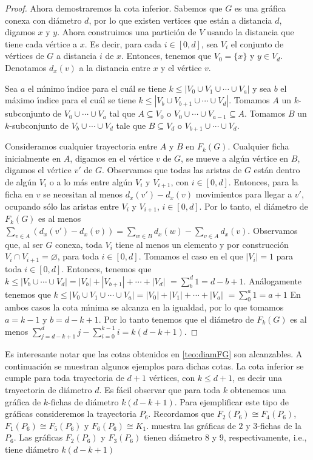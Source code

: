 \begin{proof}
Ahora demostraremos la cota inferior. Sabemos que $G$ es una gr\'afica conexa
con di\'ametro $d$, por lo que existen vertices que est\'an a distancia
$d$, digamos $x$ y $y$. Ahora construimos una partici\'on de $V$ usando  la
distancia que tiene cada v\'ertice a $x$. Es decir, para cada $i\in [0,d]$,
sea $V_{i}$ el conjunto de v\'ertices de $G$ a distancia $i$ de $x$. Entonces,
tenemos que $V_{0}=\{x\}$ y $y\in V_{d}$. Denotamos $d_x(v)$ a la distancia
entre $x$ y el v\'ertice $v$.

Sea $a$ el m\'\i{}nimo \'\i{}ndice para el cu\'al se tiene $k \leq |V_{0}\cup
V_{1}\cup \cdots \cup V_{a}|$ y sea $b$ el m\'aximo \'\i{}ndice para el cu\'al se
tiene $k\leq |V_{b}\cup V_{b+1}\cup \cdots \cup V_{d}|$. Tomamos $A$ un
$k$-subconjunto de $V_{0}\cup \cdots \cup V_{a}$  tal que $A\subseteq
V_{0}$ o $V_{0}\cup \cdots \cup V_{a-1}\subseteq A$. Tomamos $B$ un
$k$-subconjunto de $V_{b}\cup \cdots \cup V_{d}$ tale que
$B\subseteq V_{d}$ o $V_{b+1}\cup \cdots \cup V_{d}$. 

Consideramos cualquier trayectoria entre $A$ y $B$ en $F_{k}(G)$. Cualquier
ficha inicialmente en $A$, digamos en el v\'ertice $v$ de $G$, se mueve a
alg\'un v\'ertice en $B$, digamos el v\'ertice $v'$ de $G$. Observamos que todas
las aristas de $G$ est\'an dentro de alg\'un $V_{i}$ o a lo m\'as entre alg\'un
$V_{i}$ y $V_{i+1}$, con $i\in[0,d]$. Entonces, para la ficha en $v$ se
necesitan al menos $d_x(v')-d_x(v)$ movimientos para llegar a $v'$, ocupando
s\'olo las aristas entre $V_{i}$ y $V_{i+1}$, $i\in [0,d]$. Por lo tanto,
el di\'ametro de $F_{k}(G)$ es al menos $\sum_{v\in A}(d_x(v')-d_x(v))=
\sum_{w\in B}d_x(w)-\sum_{v\in A}d_x(v)$. Observamos que, al ser $G$ conexa,
toda $V_{i}$ tiene al menos un elemento y por construcci\'on $V_{i} \cap
V_{i+1}=\varnothing$, para toda $i\in [0,d]$. Tomamos el caso en el que
$|V_{i}|=1$ para toda $i\in [0,d]$. Entonces, tenemos que $k\leq
|V_{b}\cup\cdots\cup V_{d}|=|V_{b}|+|V_{b+1}|+\cdots +|V_d|$
$=\sum_{b}^{d}1 = d -b+1$. An\'alogamente tenemos que $k\leq
|V_{0}\cup V_{1}\cup \cdots \cup V_{a}|=|V_{0}|+|V_{1}|+\cdots + |V_{a}|$
$=\sum_{0}^{a} 1 = a+1$ En ambos casos la cota m\'\i{}nima se alcanza en la
igualdad, por lo que tomamos $a=k-1$ y $b=d-k+1$. Por lo tanto tenemos que
el di\'ametro de $F_{k}(G)$ es al menos $\sum_{j=d -k+1}^{d}j -
\sum_{i=0}^{k-1}i = k(d-k+1)$.
\end{proof}

Es interesante notar que las cotas obtenidos en \cref{teo:diamFG} son
alcanzables. A continuaci\'on se muestran algunos ejemplos para dichas cotas. La
cota inferior se cumple para toda trayectoria de $d +1$ v\'ertices, con $k \leq
d +1$, es decir una trayectoria de di\'ametro $d$. Es f\'acil observar que para
toda $k$ obtenemos una gr\'afica de $k$-fichas de di\'ametro $k(d-k+1)$. Para
ejemplificar este tipo de gr\'aficas consideremos la trayectoria $P_6$.
Recordamos que $F_2(P_6) \cong F_4(P_6)$, $F_1(P_6) \cong F_5(P_6)$ y $F_6(P_6)
\cong K_1$.  muestra las gr\'aficas de $2$ y
$3$-fichas de la $P_6$. Las gr\'aficas $F_2(P_6)$ y $F_3(P_6)$ tienen di\'ametro
$8$ y $9$, respectivamente, i.e., tiene di\'ametro $k(d-k+1)$

